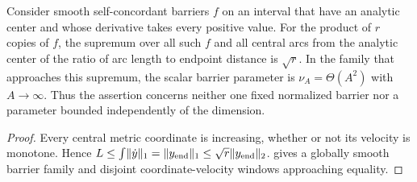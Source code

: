 \begin{proposition}
\label{prop:nonmonotone}
Consider smooth self-concordant barriers $f$ on an interval that have
an analytic center and whose derivative takes every positive value.
For the product of $r$ copies of $f$, the supremum over all such $f$
and all central arcs from the analytic center of the ratio of arc
length to endpoint distance is $\sqrt r$. In the family that approaches
this supremum, the scalar barrier parameter is $\nu_A=\Theta(A^2)$ with
$A\to\infty$. Thus the assertion concerns neither one fixed normalized
barrier nor a parameter bounded independently of the dimension.
\end{proposition}
\begin{proof}
Every central metric coordinate is increasing, whether or not its
velocity is monotone. Hence
$L\leq\int\lVert \dot y\rVert_1=\lVert y_{\mathrm{end}}\rVert_1
\leq\sqrt r\lVert y_{\mathrm{end}}\rVert_2$.
 gives a globally smooth barrier
family and disjoint coordinate-velocity windows approaching equality.
\end{proof}

